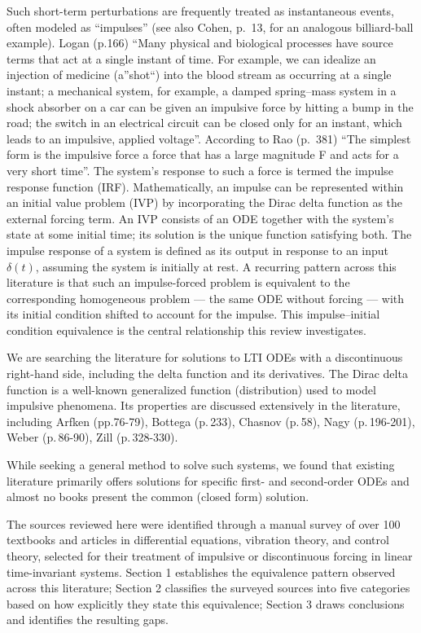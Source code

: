 \documentclass[
  11pt,
]{article}
\begin{document}
Such short-term perturbations are frequently treated as instantaneous
events, often modeled as ``impulses'' (see also Cohen, p.~13, for an
analogous billiard-ball example). Logan (p.166) ``Many physical and
biological processes have source terms that act at a single instant of
time. For example, we can idealize an injection of medicine (a''shot``)
into the blood stream as occurring at a single instant; a mechanical
system, for example, a damped spring--mass system in a shock absorber on
a car can be given an impulsive force by hitting a bump in the road; the
switch in an electrical circuit can be closed only for an instant, which
leads to an impulsive, applied voltage''. According to Rao (p.~381)
``The simplest form is the impulsive force a force that has a large
magnitude F and acts for a very short time''. The system's response to
such a force is termed the impulse response function (IRF).
Mathematically, an impulse can be represented within an initial value
problem (IVP) by incorporating the Dirac delta function as the external
forcing term. An IVP consists of an ODE together with the system's state
at some initial time; its solution is the unique function satisfying
both. The impulse response of a system is defined as its output in
response to an input \(\delta(t)\), assuming the system is initially at
rest. A recurring pattern across this literature is that such an
impulse-forced problem is equivalent to the corresponding homogeneous
problem --- the same ODE without forcing --- with its initial condition
shifted to account for the impulse. This impulse--initial condition
equivalence is the central relationship this review investigates.

We are searching the literature for solutions to LTI ODEs with a
discontinuous right-hand side, including the delta function and its
derivatives. The Dirac delta function is a well-known generalized
function (distribution) used to model impulsive phenomena. Its
properties are discussed extensively in the literature, including Arfken
(pp.76-79), Bottega (p.\,233), Chasnov (p.\,58), Nagy (p.\,196-201),
Weber (p.\,86-90), Zill (p.\,328-330).

While seeking a general method to solve such systems, we found that
existing literature primarily offers solutions for specific first- and
second-order ODEs and almost no books present the common (closed form)
solution.

The sources reviewed here were identified through a manual survey of
over 100 textbooks and articles in differential equations, vibration
theory, and control theory, selected for their treatment of impulsive or
discontinuous forcing in linear time-invariant systems. Section 1
establishes the equivalence pattern observed across this literature;
Section 2 classifies the surveyed sources into five categories based on
how explicitly they state this equivalence; Section 3 draws conclusions
and identifies the resulting gaps.
\end{document}
